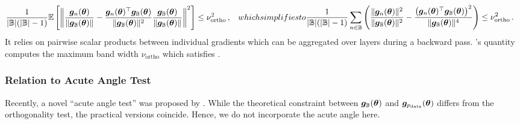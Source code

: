 \begin{subequations}
  \begin{align}
    \frac{1}{|\sB|(|\sB|-1)}
    \E\left[
    \left\lVert
    \frac{
    \vg_n(\vtheta)
    }{
    \lVert
    \vg_{\sB}(\vtheta)
    \rVert
    }
    -
    \frac{
    \vg_n(\vtheta)^\top
    \vg_{\sB}(\vtheta)
    }{
    \lVert
    \vg_{\sB}(\vtheta)
    \rVert^2
    }
    \frac{
    \vg_{\sB}(\vtheta)
    }{
    \left\lVert
    \vg_{\sB}(\vtheta)
    \right\rVert}
    \right\rVert^2
    \right]
    &\le \nu^2_{\text{ortho}}\,,
  \end{align}
  which simplifies to
  \begin{align}
    \label{cockpit::eq:orthogonality-test-feature-table}
    \frac{1}{|\sB| (|\sB| - 1)}
    \sum_{n \in \sB }
    \left(
    \frac{
    \lVert
    \vg_n(\vtheta)
    \rVert^2
    }{
    \lVert
    \vg_{\sB}(\vtheta)
    \rVert^2
    }
    -
    \frac{
    \left(
    \vg_n(\vtheta)^\top
    \vg_{\sB}(\vtheta)
    \right)^2
    }{
    \lVert
    \vg_{\sB}(\vtheta)
    \rVert^4
    }
    \right)
    &\le \nu^2_{\text{ortho}}\,.
  \end{align}
\end{subequations}
It relies on pairwise scalar products between individual gradients which can be
aggregated over layers during a backward pass. \cockpit's 
quantity computes the maximum band width $\nu_{\text{ortho}}$ which satisfies
.

\subsubsection{Relation to Acute Angle Test}

Recently, a novel ``acute angle test'' was proposed by
\citet{bahamou2019dynamic}. While the theoretical constraint between
${\bm{g}}_{{\mathbb{B}}}({\bm{\theta}})$ and ${\bm{g}}_{p_{\mathrm{data}}}({\bm{\theta}})$ differs from the orthogonality
test, the practical versions coincide. Hence, we do not incorporate the acute
angle here.

